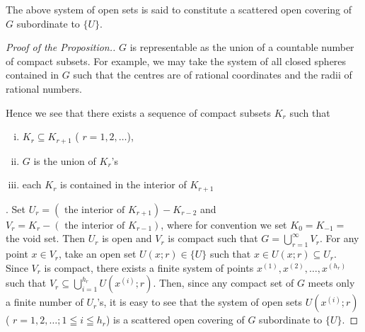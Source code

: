 \begin{definition}\label{def:I.12.Definition.1} The above system of open sets is said to constitute a scattered open covering of $G$ subordinate to $\{U\}$. 
\end{definition}

\begin{proof}[Proof of the Proposition.]
$G$ is representable as the union of a countable number of compact subsets. For example, we may take the system of all closed spheres contained in $G$ such that the centres are of rational coordinates and the radii of rational numbers.

Hence we see that there exists a sequence of compact subsets $K_r$ such that \begin{enumerate}[(i)]
\item $K_r \subseteq K_{r+1}$ ( $r = 1, 2, \ldots$),
\item $G$ is the union of $K_r$'s
\item each $K_r$ is contained in the interior of $K_{r+1}$
\end{enumerate}
. Set
$U_{r} = (\text{ the interior of } K_{r+1})- K_{r-2}$ and $V_{r} = K_{r}- (\text{ the interior of } K_{r-1})$, where for convention we set $K_{0} = K_{-1} =$ the void set. Then $U_{r}$ is open and $V_{r}$ is compact such that $G = \bigcup\limits_{r=1}^{\infty} V_{r}$. For any point $x \in V_{r}$, take an open set $U(x; r) \in \{U\}$ such that $x \in U(x; r) \subseteq U_{r}$. Since $V_{r}$ is compact, there exists a finite system of points $x^{(1)}, x^{(2)}, \ldots, x^{(h_{r})}$ such that $V_{r} \subseteq \bigcup\limits_{i=1}^{h_{r}} U(x^{(i)}; r)$. Then, since any compact set of $G$ meets only a finite number of $U_{r}$'s, it is easy to see that the system of open sets $U(x^{(i)}; r)$ ( $r = 1, 2, \ldots; 1 \leqq i \leqq h_{r}$) is a scattered open covering of $G$ subordinate to $\{U\}$. 
\end{proof}


